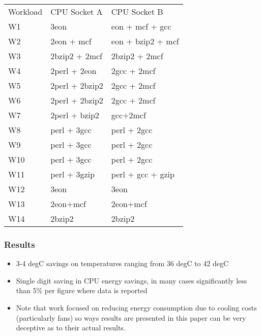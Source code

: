 \documentclass[11pt]{article}
\begin{document}
\begin{center}
\begin{tabular}{lll}
 Workload  &  CPU Socket A    &  CPU Socket B       \\
 W1        &  3eon            &  eon + mcf + gcc    \\
 W2        &  2eon + mcf      &  eon + bzip2 + mcf  \\
 W3        &  2bzip2 + 2mcf   &  2bzip2 + 2mcf      \\
 W4        &  2perl + 2eon    &  2gcc + 2mcf        \\
 W5        &  2perl + 2bzip2  &  2gcc + 2mcf        \\
 W6        &  2perl + 2bzip2  &  2gcc + 2mcf        \\
 W7        &  2perl + bzip2   &  gcc+2mcf           \\
 W8        &  perl + 3gcc     &  perl + 2gcc        \\
 W9        &  perl + 3gcc     &  perl + 2gcc        \\
 W10       &  perl + 3gcc     &  perl + 2gcc        \\
 W11       &  perl + 3gzip    &  perl + gcc + gzip  \\
 W12       &  3eon            &  3eon               \\
 W13       &  2eon+mcf        &  2eon+mcf           \\
 W14       &  2bzip2          &  2bzip2             \\
\end{tabular}
\end{center}
\subsubsection{Results}
\label{sec-4-3-2}

\begin{itemize}
\item 3-4 degC savings on temperatures ranging from 36 degC to 42 degC
\item Single digit saving in CPU energy savings, in many cases
      significantly less than 5\% per figure where data is reported
\item Note that work focused on reducing energy consumption due to
      cooling costs (particularly fans) so ways results are presented in
      this paper can be very deceptive as to their actual results.
\end{itemize}


    
\end{document}
